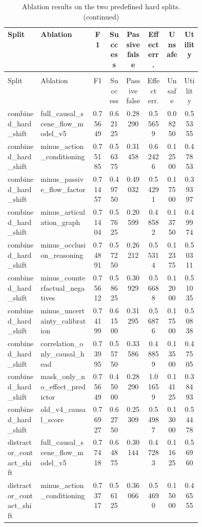 \documentclass{article}
\begin{document}
\begin{center}
\scriptsize
\begin{longtable}{p{0.17\linewidth}p{0.27\linewidth}cccccc}
\caption{Ablation results on the two predefined hard splits.}\label{tab:ablations}\\
\toprule
Split & Ablation & F1 & Success & Passive false & Effect err. & Unsafe & Utility\\
\midrule
\endfirsthead
\caption[]{Ablation results on the two predefined hard splits. (continued)}\\
\toprule
Split & Ablation & F1 & Success & Passive false & Effect err. & Unsafe & Utility\\
\midrule
\endhead
combined\_hard\_shift & full\_causal\_scene\_flow\_model\_v5 & 0.75649 & 0.62125 & 0.28290 & 0.55659 & 0.08250 & 0.55355\\
combined\_hard\_shift & minus\_action\_conditioning & 0.75185 & 0.56375 & 0.31458 & 0.62426 & 0.12500 & 0.47853\\
combined\_hard\_shift & minus\_passive\_flow\_factor & 0.71457 & 0.49750 & 0.49032 & 0.54291 & 0.17500 & 0.39397\\
combined\_hard\_shift & minus\_articulation\_graph & 0.71404 & 0.57625 & 0.20599 & 0.48582 & 0.13750 & 0.49974\\
combined\_hard\_shift & minus\_occlusion\_reasoning & 0.74891 & 0.57250 & 0.26212 & 0.55314 & 0.12375 & 0.50311\\
combined\_hard\_shift & minus\_counterfactual\_negatives & 0.75612 & 0.58625 & 0.30929 & 0.56688 & 0.12000 & 0.51035\\
combined\_hard\_shift & minus\_uncertainty\_calibration & 0.74199 & 0.61500 & 0.31295 & 0.56876 & 0.17500 & 0.50838\\
combined\_hard\_shift & correlation\_only\_causal\_head & 0.73995 & 0.55750 & 0.33586 & 0.48859 & 0.13500 & 0.47505\\
combined\_hard\_shift & mask\_only\_no\_effect\_predictor & 0.75649 & 0.45000 & 0.28290 & 1.01659 & 0.14125 & 0.38493\\
combined\_hard\_shift & old\_v4\_causal\_score & 0.76927 & 0.62750 & 0.25309 & 0.54987 & 0.13000 & 0.54478\\
distractor\_contact\_shift & full\_causal\_scene\_flow\_model\_v5 & 0.77418 & 0.64875 & 0.30144 & 0.47283 & 0.11625 & 0.56960\\
distractor\_contact\_shift & minus\_action\_conditioning & 0.73717 & 0.56125 & 0.36066 & 0.54690 & 0.15000 & 0.46555\\

\end{longtable}
\end{center}
\end{document}
